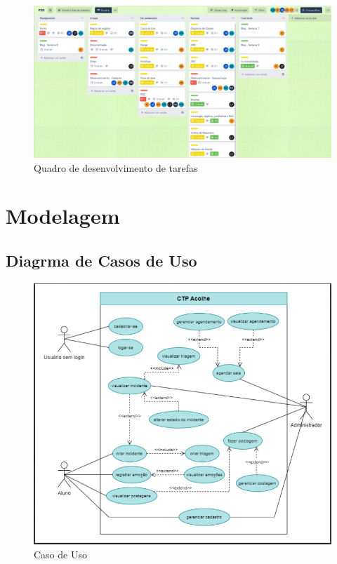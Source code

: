\documentclass[12pt,a4paper]{article}
\begin{document}
\begin{figure}[H]
    \centering
     \includegraphics[width=15cm]{img7.png}
    \caption{Quadro de desenvolvimento de tarefas}
    \label{l01}
\end{figure}

\newpage

\section{Modelagem}
\subsection{Diagrma de Casos de Uso}
\begin{figure}[H]
    \centering
     \includegraphics[width=15cm]{casouso.png}
     \caption{Caso de Uso}
     \label{casouso}
\end{figure}
\end{document}
